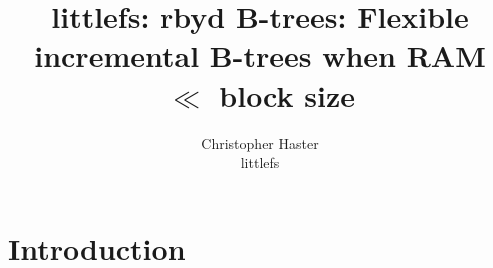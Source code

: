 \documentclass[letterpaper,twocolumn,10pt]{article}
\def\lfs+{littlefs}
\begin{document}

\date{}

\title{\Large \bf
    \lfs+: rbyd B-trees: Flexible incremental B-trees when RAM $\ll$ block size
}

\ifdefined\yesanon\else
\author{
{\rm Christopher Haster}\\
\lfs+
} %
\fi

\maketitle



\section{Introduction}
\label{sec:introduction}
\end{document}
